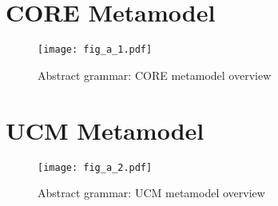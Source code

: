\section{CORE Metamodel}

\begin{figure}[h]
	\centering
	\texttt{[image: fig\_a\_1.pdf]}
	\caption{Abstract grammar: CORE metamodel overview}
	\label{fig:a.1}
\end{figure}

\section{UCM Metamodel}

\begin{figure}[h]
	\centering
	\texttt{[image: fig\_a\_2.pdf]}
	\caption{Abstract grammar: UCM metamodel overview}
	\label{fig:a.2}
\end{figure}
